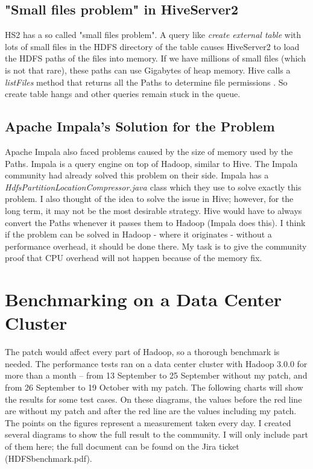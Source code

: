 \subsection{"Small files problem" in HiveServer2}
HS2 has a so called "small files problem". A query like \textit{create external table} with lots of small files in the  HDFS directory of the table causes HiveServer2 to load the HDFS paths of the files into memory. If we have millions of small files (which is not that rare), these paths can use Gigabytes of heap memory. Hive calls a \textit{listFiles} method that returns all the Paths to determine file permissions \etc. So create table hangs and other queries remain stuck in the queue.

\subsection{Apache Impala's Solution for the Problem}
Apache Impala also faced problems caused by the size of memory used by the Paths. Impala is a query engine on top of Hadoop, similar to Hive. The Impala community had already solved this problem on their side. Impala has a \textit{HdfsPartitionLocationCompressor.java \cite{impala-solution}} class which they use to solve exactly this problem. I also thought of the idea to solve the issue in Hive; however, for the long term, it may not be the most desirable strategy. Hive would have to always convert the Paths whenever it passes them to Hadoop (Impala does this). I think if the problem can be solved in Hadoop - where it originates - without a performance overhead, it should be done there. My task is to give the community proof that CPU overhead will not happen because of the memory fix. 

\section{Benchmarking on a Data Center Cluster}
The patch would affect every part of Hadoop, so a thorough benchmark is needed. The performance tests ran on a data center cluster with Hadoop 3.0.0 for more than a month – from 13 September to 25 September without my patch, and from 26 September to 19 October with my patch. The following charts will show the results for some test cases. On these diagrams, the values before the red line are without my patch and after the red line are the values including my patch. The points on the figures represent a measurement taken every day. I created several diagrams to show the full result to the community. I will only include part of them here; the full document can be found on the Jira ticket \cite{hdfs-path} (HDFSbenchmark.pdf).

